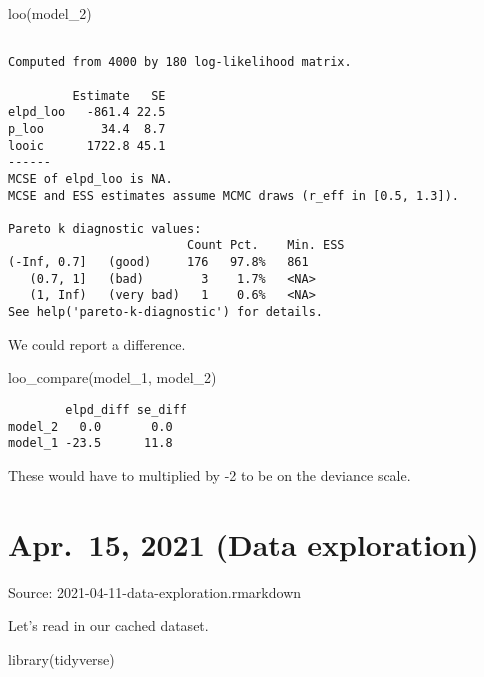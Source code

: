 \documentclass[
  letterpaper,
  DIV=11,
  numbers=noendperiod]{scrreprt}
\newenvironment{Shaded}{\begin{snugshade}}{\end{snugshade}}
\newcommand{\FunctionTok}[1]{\textcolor[rgb]{0.28,0.35,0.67}{#1}}
\newcommand{\NormalTok}[1]{\textcolor[rgb]{0.00,0.23,0.31}{#1}}
\begin{document}
\begin{Shaded}
\begin{Highlighting}[]
\FunctionTok{loo}\NormalTok{(model\_2)}
\end{Highlighting}
\end{Shaded}

\begin{verbatim}

Computed from 4000 by 180 log-likelihood matrix.

         Estimate   SE
elpd_loo   -861.4 22.5
p_loo        34.4  8.7
looic      1722.8 45.1
------
MCSE of elpd_loo is NA.
MCSE and ESS estimates assume MCMC draws (r_eff in [0.5, 1.3]).

Pareto k diagnostic values:
                         Count Pct.    Min. ESS
(-Inf, 0.7]   (good)     176   97.8%   861     
   (0.7, 1]   (bad)        3    1.7%   <NA>    
   (1, Inf)   (very bad)   1    0.6%   <NA>    
See help('pareto-k-diagnostic') for details.
\end{verbatim}

We could report a difference.

\begin{Shaded}
\begin{Highlighting}[]
\FunctionTok{loo\_compare}\NormalTok{(model\_1, model\_2)}
\end{Highlighting}
\end{Shaded}

\begin{verbatim}
        elpd_diff se_diff
model_2   0.0       0.0  
model_1 -23.5      11.8  
\end{verbatim}

These would have to multiplied by -2 to be on the deviance scale.


\chapter{Apr.~15, 2021 (Data
exploration)}\label{apr.-15-2021-data-exploration}

Source: 2021-04-11-data-exploration.rmarkdown

Let's read in our cached dataset.

\begin{Shaded}
\begin{Highlighting}[]
\FunctionTok{library}\NormalTok{(tidyverse)}
\end{Highlighting}
\end{Shaded}
\end{document}

